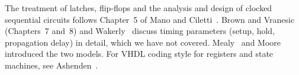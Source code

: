 The treatment of latches, flip-flops and the analysis and design of clocked sequential circuits follows Chapter~5 of Mano and Ciletti~\cite{mano2018}. Brown and Vranesic~\cite{brown2009} (Chapters~7 and~8) and Wakerly~\cite{wakerly2006} discuss timing parameters (setup, hold, propagation delay) in detail, which we have not covered. Mealy~\cite{mealy1955} and Moore~\cite{moore1956} introduced the two models. For VHDL coding style for registers and state machines, see Ashenden~\cite{ashenden2008}.
